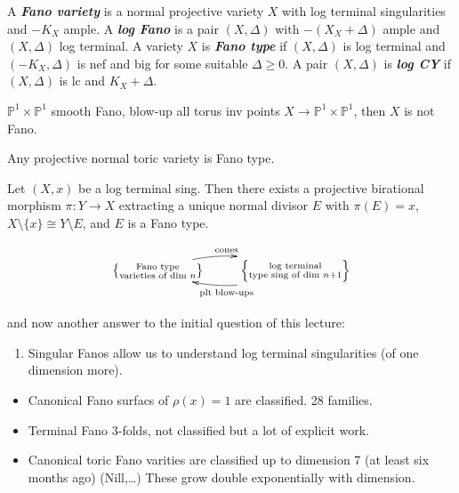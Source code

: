 \begin{definition}
\label{definition-moraga-11}
A \textit{\textbf{Fano variety}} is a normal
projective variety $X$ with log terminal
singularities and $-K_{X}$ ample. A
\textit{\textbf{log Fano}} is a pair
$(X,\Delta)$ with $-(X_{X}+\Delta)$ ample and
$(X,\Delta)$ log terminal. A variety $X$ is
\textit{\textbf{Fano type}} if $(X,\Delta)$
is log terminal and $(-K_{X},\Delta)$ is nef
and big for some suitable $\Delta \geq 0$. A
pair $(X,\Delta)$ is \textit{\textbf{log CY}}
if $(X,\Delta)$ is lc and $K_{X}+\Delta$.
\end{definition}

\begin{exercise}
\label{exercise-moraga-3}
$\mathbb{P}^{1} \times \mathbb{P}^{1}$ smooth
Fano, blow-up all torus inv points $X\to
\mathbb{P}^{1} \times \mathbb{P}^{1}$, then
$X$ is not Fano.
\end{exercise}

\begin{remark}
\label{remark-moraga-5}
Any projective normal toric variety is Fano
type.
\end{remark}

\begin{theorem}[Prokhorov, X 14]
\label{theorem-moraga-17}
Let $(X,x)$ be a log terminal sing. Then
there exists a projective birational morphism
$\pi:Y\to  X$ extracting a unique normal
divisor $E$ with $\pi(E)=x$, $X\setminus
\{x\} \cong Y\setminus E$, and $E$ is a Fano
type.
\end{theorem}

$$
\xymatrix{\left\{ \substack{\text{Fano
type}\\ \text{varieties of dim } n}
\right\}\ar@/^1pc/[r]^{\text{cones}}&\left\{
\substack{\text{log terminal}\\ \text{type
sing of dim } n+1}
\right\}\ar@/^1pc/[l]^{\text{plt blow-ups}}}
$$

and now another answer to the initial
question of this lecture:

\begin{enumerate}
\item[4.] Singular Fanos allow us to
understand log terminal singularities (of one
dimension more).
\end{enumerate}

\medskip{}

\begin{itemize}
\item Canonical Fano surfacs of $\rho(x)=1$
are classified. 28 families.
\item Terminal Fano 3-folds, not classified
but a lot of explicit work.
\item Canonical toric Fano varities are
classified up to dimension 7 (at least six
months ago) (Nill,\ldots{}) These grow double
exponentially with dimension.
\end{itemize}

